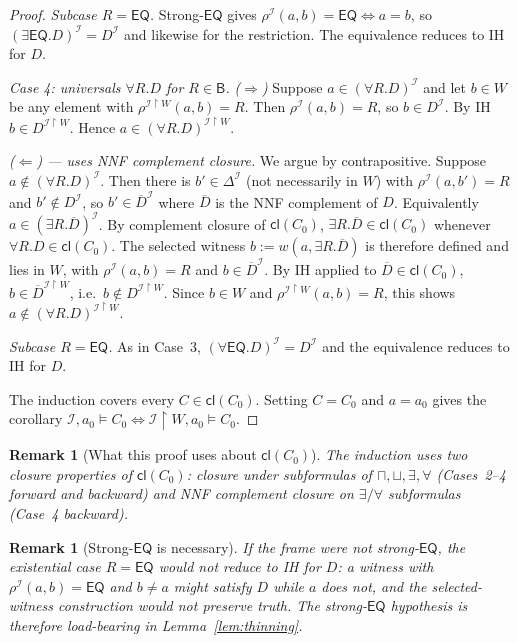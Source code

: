 \documentclass[11pt]{article}
\newtheorem{remark}[theorem]{Remark}
\newcommand{\Base}{\mathsf{B}}
\newcommand{\EQ}{\mathsf{EQ}}
\newcommand{\Cl}{\mathsf{cl}}
\newcommand{\I}{\mathcal I}
\begin{document}
\begin{proof}
\emph{Subcase $R=\EQ$.}  Strong-$\EQ$ gives
$\rho^\I(a,b)=\EQ\iff a=b$, so $(\exists \EQ.D)^\I=D^\I$ and likewise
for the restriction.  The equivalence reduces to IH for $D$.

\emph{Case 4: universals $\forall R.D$ for $R\in\Base$.}
\emph{($\Rightarrow$)} Suppose $a\in(\forall R.D)^\I$ and let
$b\in W$ be any element with
$\rho^{\I\upharpoonright W}(a,b)=R$.  Then $\rho^\I(a,b)=R$, so
$b\in D^\I$.  By IH $b\in D^{\I\upharpoonright W}$.  Hence
$a\in(\forall R.D)^{\I\upharpoonright W}$.

\emph{($\Leftarrow$) --- uses NNF complement closure.}  We argue by
contrapositive.  Suppose $a\notin(\forall R.D)^\I$.  Then there is
$b'\in\Delta^\I$ (not necessarily in $W$) with $\rho^\I(a,b')=R$ and
$b'\notin D^\I$, so $b'\in\overline D^\I$ where $\overline D$ is the
NNF complement of $D$.  Equivalently $a\in(\exists R.\overline D)^\I$.
By complement closure of $\Cl(C_0)$, $\exists R.\overline D\in\Cl(C_0)$
whenever $\forall R.D\in\Cl(C_0)$.  The selected witness
$b:=w(a,\exists R.\overline D)$ is therefore defined and lies in $W$,
with $\rho^\I(a,b)=R$ and $b\in\overline D^\I$.  By IH applied to
$\overline D\in\Cl(C_0)$, $b\in\overline D^{\I\upharpoonright W}$,
i.e.\ $b\notin D^{\I\upharpoonright W}$.  Since $b\in W$ and
$\rho^{\I\upharpoonright W}(a,b)=R$, this shows
$a\notin(\forall R.D)^{\I\upharpoonright W}$.

\emph{Subcase $R=\EQ$.}  As in Case~3,
$(\forall \EQ.D)^\I=D^\I$ and the equivalence reduces to IH for $D$.

The induction covers every $C\in\Cl(C_0)$.  Setting $C=C_0$ and
$a=a_0$ gives the corollary
$\I,a_0\models C_0\iff\I\!\upharpoonright\!W,a_0\models C_0$.
\end{proof}

\begin{remark}[What this proof uses about $\Cl(C_0)$]
The induction uses two closure properties of $\Cl(C_0)$: closure
under subformulas of $\sqcap,\sqcup,\exists,\forall$ (Cases~2--4
forward and backward) and \emph{NNF complement closure} on
$\exists/\forall$ subformulas (Case~4 backward).
\end{remark}

\begin{remark}[Strong-$\EQ$ is necessary]
If the frame were not strong-$\EQ$, the existential case $R=\EQ$
would not reduce to IH for $D$: a witness with $\rho^\I(a,b)=\EQ$ and
$b\ne a$ might satisfy $D$ while $a$ does not, and the selected-witness
construction would not preserve truth.  The strong-$\EQ$ hypothesis
is therefore load-bearing in Lemma~\ref{lem:thinning}.
\end{remark}
\end{document}
